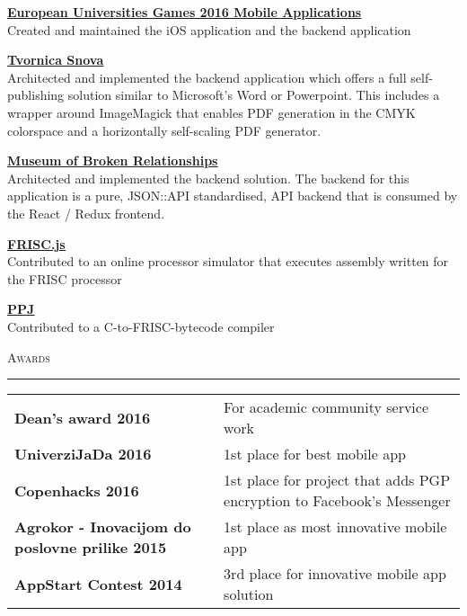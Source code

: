 \documentclass[10pt, a4paper, final, onecolumn, oneside, notitlepage]{article}
\newcommand{\sectionspacing}[0]{ \vspace{10pt} } %
\newcommand{\sectionrule}[0]{ \rule[6pt]{\textwidth}{0.5pt} } %
\renewcommand{\section}[1]{\sectionspacing {\large \scshape #1} \sectionrule}
\begin{document}
\begin{center}
\begin{flushleft}
\textbf{\href{https://itunes.apple.com/us/app/eug-2016/id1126963997?mt=8}{\underline{European Universities Games 2016 Mobile Applications}}} \\
Created and maintained the iOS application and the backend application \\
\vspace{2mm}

\textbf{\href{https://tvornica-snova.hr}{\underline{Tvornica Snova}}} \\
Architected and implemented the backend application which offers a full
self-publishing solution similar to Microsoft's Word or Powerpoint.
This includes a wrapper around ImageMagick that enables PDF generation in the
CMYK colorspace and a horizontally self-scaling PDF generator. \\
\vspace{2mm}

\textbf{\href{https://brokenships.com}{\underline{Museum of Broken Relationships}}} \\
Architected and implemented the backend solution. The backend for this application
is a pure, JSON::API standardised, API backend that is consumed by the
React / Redux frontend. \\
\vspace{2mm}

\textbf{\href{https://github.com/izuzak/FRISCjs}{\underline{FRISC.js}}} \\
Contributed to an online processor simulator that executes assembly written for
the FRISC processor \\
\vspace{2mm}

\textbf{\href{https://github.com/Stankec/PPJ}{\underline{PPJ}}} \\
Contributed to a C-to-FRISC-bytecode compiler \\
\end{flushleft}


\section{Awards}
\begin{tabular}{ >{\hfill}p{} p{} }
\textbf{Dean's award 2016} & For academic community service work \\
\textbf{UniverziJaDa 2016} & 1st place for best mobile app \\
\textbf{Copenhacks 2016} & 1st place for project that adds PGP encryption to
Facebook's Messenger \\
\textbf{Agrokor - Inovacijom do poslovne prilike 2015} & 1st place as most
innovative mobile app \\
\textbf{AppStart Contest 2014} & 3rd place for innovative mobile app solution \\
\end{tabular}



\end{center}
\end{document}
